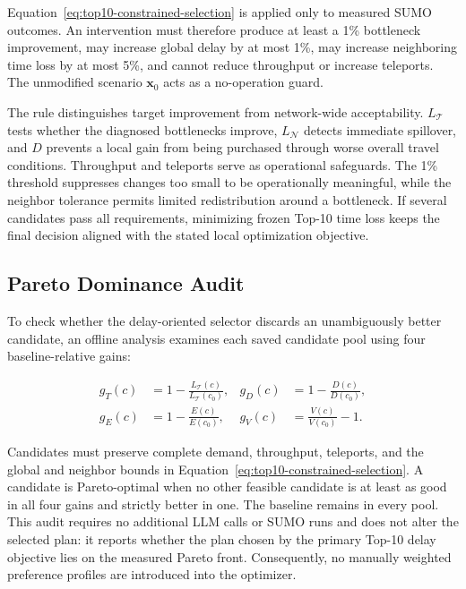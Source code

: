 \documentclass{trbunofficial}
\begin{document}
Equation~\ref{eq:top10-constrained-selection} is applied only to measured SUMO
outcomes.  An intervention must therefore produce at least a 1\% bottleneck
improvement, may increase global delay by at most 1\%, may increase neighboring
time loss by at most 5\%, and cannot reduce throughput or increase teleports.
The unmodified scenario $\mathbf{x}_0$ acts as a no-operation guard.

The rule distinguishes target improvement from network-wide acceptability.
$L_{\mathcal{T}}$ tests whether the diagnosed bottlenecks improve,
$L_{\mathcal{N}}$ detects immediate spillover, and $D$ prevents a local gain
from being purchased through worse overall travel conditions.  Throughput and
teleports serve as operational safeguards.  The 1\% threshold suppresses
changes too small to be operationally meaningful, while
the neighbor tolerance permits limited redistribution around a bottleneck.  If
several candidates pass all requirements, minimizing frozen Top-10 time loss
keeps the final decision aligned with the stated local optimization objective.

\subsection{Pareto Dominance Audit}
\label{sec:pareto-method}

To check whether the delay-oriented selector discards an unambiguously better
candidate, an offline analysis examines each saved candidate pool using four
baseline-relative gains:

\begin{equation}
\begin{aligned}
g_T(c) &= 1-\frac{L_{\mathcal{T}}(c)}{L_{\mathcal{T}}(c_0)}, &
g_D(c) &= 1-\frac{D(c)}{D(c_0)},\\
g_E(c) &= 1-\frac{E(c)}{E(c_0)}, &
g_V(c) &= \frac{V(c)}{V(c_0)}-1.
\end{aligned}
\label{eq:pareto-gains}
\end{equation}

Candidates must preserve complete demand, throughput, teleports, and the global
and neighbor bounds in Equation~\ref{eq:top10-constrained-selection}.  A
candidate is Pareto-optimal when no other feasible candidate is at least as
good in all four gains and strictly better in one.  The baseline remains in
every pool.  This audit requires no additional LLM calls or SUMO runs and does
not alter the selected plan: it reports whether the plan chosen by the primary
Top-10 delay objective lies on the measured Pareto front.  Consequently, no
manually weighted preference profiles are introduced into the optimizer.
\end{document}
